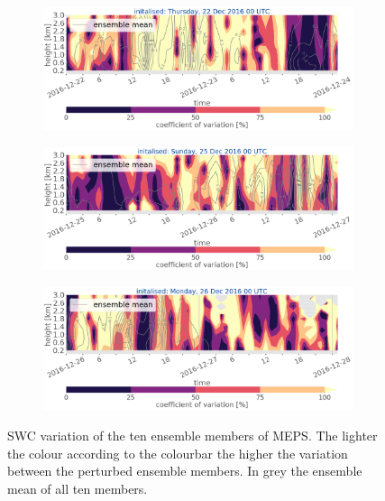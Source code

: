 \begin{figure}[t!]
	\centering
	\begin{subfigure}[b]{\textwidth}
		\includegraphics[trim={0cm 5cm 0cm 0cm},clip,width=\textwidth]{./fig_variation/20161222}
		\caption{}\label{fig:vari:EM22}
	\end{subfigure}
	\begin{subfigure}[b]{\textwidth}
		\includegraphics[trim={0cm 5cm 0cm 0cm},clip,width=\textwidth]{./fig_variation/20161225}
		\caption{}\label{fig:vari:EM25}
	\end{subfigure}
	\begin{subfigure}[b]{\textwidth}
		\includegraphics[trim={0cm 0cm 0cm 0cm},clip,width=\textwidth]{./fig_variation/20161226}
		\caption{}\label{fig:vari:EM26}
	\end{subfigure}
	\caption{SWC variation of the ten ensemble members of MEPS. The lighter the colour according to the colourbar the higher the variation between the perturbed ensemble members. In grey the ensemble mean of all ten members.}\label{fig:ens_vari}
\end{figure}
